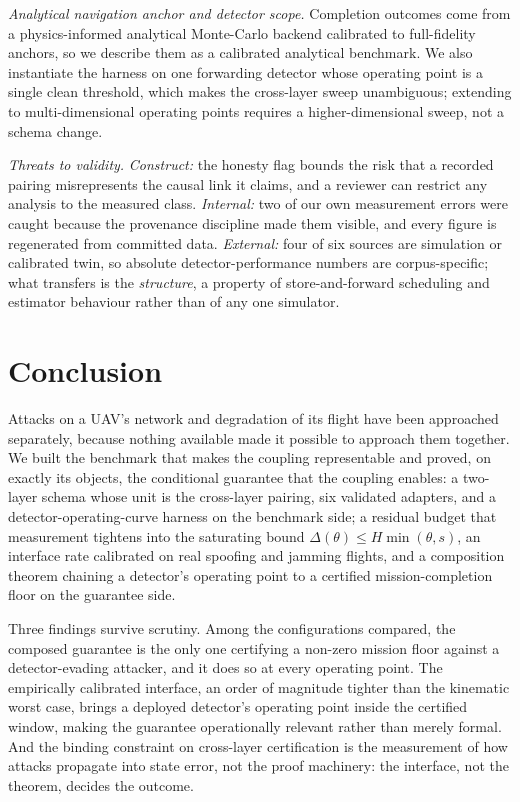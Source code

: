 \emph{Analytical navigation anchor and detector scope.} Completion outcomes come
from a physics-informed analytical Monte-Carlo backend calibrated to
full-fidelity anchors, so we describe them as a calibrated analytical benchmark.
We also instantiate the harness on one forwarding detector whose operating point
is a single clean threshold, which makes the cross-layer sweep unambiguous;
extending to multi-dimensional operating points requires a higher-dimensional
sweep, not a schema change.

\emph{Threats to validity.} \emph{Construct:} the honesty flag bounds the risk
that a recorded pairing misrepresents the causal link it claims, and a reviewer
can restrict any analysis to the measured class. \emph{Internal:} two of our own
measurement errors were caught because the provenance discipline made them
visible, and every figure is regenerated from committed data. \emph{External:}
four of six sources are simulation or calibrated twin, so absolute
detector-performance numbers are corpus-specific; what transfers is the
\emph{structure}, a property of store-and-forward scheduling and estimator
behaviour rather than of any one simulator.

\section{Conclusion}
\label{sec:conclusion}
Attacks on a UAV's network and degradation of its flight have been approached
separately, because nothing available made it possible to approach them
together. We built the benchmark that makes the coupling representable and
proved, on exactly its objects, the conditional guarantee that the coupling enables: a two-layer schema whose unit
is the cross-layer pairing, six validated adapters, and a
detector-operating-curve harness on the benchmark side; a residual budget that
measurement tightens into the saturating bound $\Delta(\theta)\le
H\min(\theta,s)$, an interface rate calibrated on real spoofing and jamming
flights, and a composition theorem chaining a detector's operating point to a
certified mission-completion floor on the guarantee side.

Three findings survive scrutiny. Among the configurations compared, the composed
guarantee is the only one certifying a non-zero mission floor against a
detector-evading attacker, and it does so at every operating point. The
empirically calibrated interface, an order of magnitude tighter than the
kinematic worst case, brings a deployed detector's operating point inside the
certified window, making the guarantee operationally relevant rather than merely
formal. And the binding constraint on cross-layer certification is the
measurement of how attacks propagate into state error, not the proof machinery:
the interface, not the theorem, decides the outcome.

